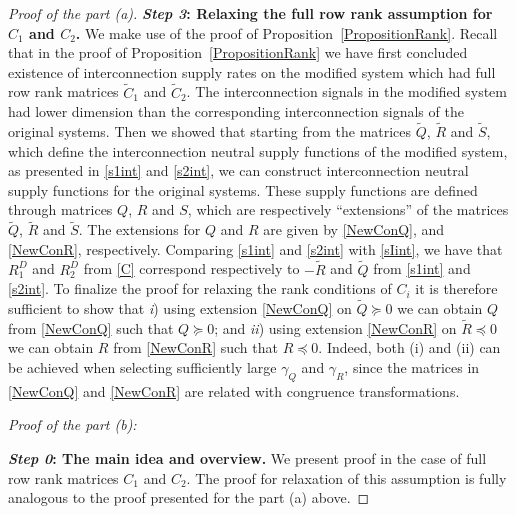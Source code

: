 \documentclass[11pt,a4paper,oneside,DIV=12,headings=small]{scrartcl}
\theoremstyle{plain}
\begin{document}
\begin{proof}[Proof of the part (a)]
\textbf{\emph{Step 3}: Relaxing the full row rank assumption for $C_1$ and $C_2$.} \newline 
We make use of the proof of Proposition~\ref{PropositionRank}. Recall that in the proof of Proposition~\ref{PropositionRank} we have first concluded existence of interconnection supply rates on the modified system which had full row rank matrices $\tilde{C}_1$ and $\tilde{C}_2$. The interconnection signals in the modified system had lower dimension than the corresponding interconnection signals of the original systems. Then we showed that starting from the matrices $\tilde{Q}$, $\tilde{R}$ and $\tilde{S}$, which define the interconnection neutral supply functions of the modified system, as presented in \eqref{s1int} and \eqref{s2int}, we can construct interconnection neutral supply functions for the original systems. These supply functions are defined through matrices $Q$, $R$ and $S$, which are respectively ``extensions'' of the matrices $\tilde{Q}$, $\tilde{R}$ and $\tilde{S}$. The extensions for $Q$ and $R$ are given by \eqref{NewConQ}, and \eqref{NewConR}, respectively. Comparing \eqref{s1int} and \eqref{s2int} with \eqref{sIint}, we have that $R_1^D$ and $R_2^D$ from \eqref{C} correspond respectively to $-\tilde{R}$ and $\tilde{Q}$ from \eqref{s1int} and \eqref{s2int}. To finalize the proof for relaxing the rank conditions of $C_i$ it is therefore sufficient to show that \emph{i}) using extension \eqref{NewConQ} on $\tilde{Q} \succeq 0$ we can obtain $Q$ from \eqref{NewConQ} such that $Q \succeq 0$; and \emph{ii}) using extension \eqref{NewConR} on $\tilde{R} \preceq 0$ we can obtain $R$ from \eqref{NewConR} such that $R \preceq 0$. Indeed, both (i) and (ii) can be achieved when selecting sufficiently large $\gamma_Q$ and $\gamma_R$, since the matrices in \eqref{NewConQ} and \eqref{NewConR} are related with congruence transformations. \\ 
\newline

\emph{Proof of the part (b):}

\textbf{\emph{Step 0}: The main idea and overview.} \newline
We present proof in the case of full row rank matrices $C_1$ and $C_2$. The proof for relaxation of this assumption is fully analogous to the proof presented for the part (a) above.


\end{proof}
\end{document}
